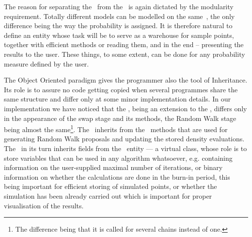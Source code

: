 \documentclass{book}
\begin{document}
The reason for separating the \measure\, from the \sspace\, is again dictated by the modularity requirement. Totally different models can be modelled on the same \sspace\,, the only difference being the way the probability is assigned. It is therefore natural to define an entity whose task will be to serve as a warehouse for sample points, together with efficient methods or reading them, and in the end -- presenting the results to the user. These things, to some extent, can be done for any probability measure defined by the user. 

The Object Oriented paradigm gives the programmer also the tool of Inheritance. Its role is to assure no code getting copied when several programmes share the same structure and differ only at some minor implementation details. In our implementation we have noticed that the \PTalgo, being an extension to the \MH, differs only in the appearance of the swap stage and its methods, the Random Walk stage being almost the same\footnote{The difference being that it is called for several chains instead of one.}. The \PTalgo\, inherits from the \MH\, methods that are used for generating Random Walk proposals and updating the stored density evaluations. The \MH\, in its turn inherits fields from the \algo\, entity --- a virtual class, whose role is to store variables that can be used in any algorithm whatsoever, e.g. containing information on the user-supplied maximal number of iterations, or binary information on whether the calculations are done in the burn-in period, this being important for efficient storing of simulated points, or whether the simulation has been already carried out which is important for proper visualisation of the results. 
\end{document}
